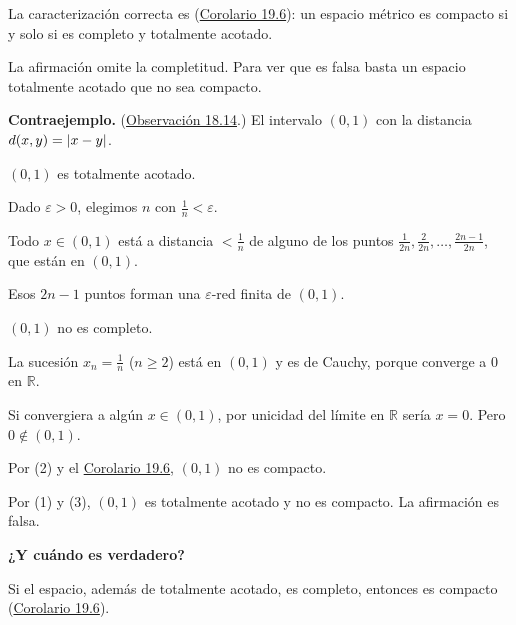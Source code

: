 \documentclass[11pt,a4paper]{article}
\newcommand{\R}{\mathbb{R}}\newcommand{\N}{\mathbb{N}}\newcommand{\Q}{\mathbb{Q}}
\providecommand{\lt}{<}\providecommand{\gt}{>}
\newcommand{\bloque}[1]{\par\smallskip\noindent\textbf{\color{acento}#1}\par}
\begin{document}
\begin{pasos}
\item[] La caracterización correcta es (\href{https://decostruttivismo.github.io/MAT2514-repaso/pdf/MAT2514_apuntes_completos.pdf\#nameddest=teorema.19.6}{Corolario 19.6}): un espacio métrico es compacto si y solo si es completo y totalmente acotado.
\item[] La afirmación omite la completitud. Para ver que es falsa basta un espacio totalmente acotado que no sea compacto.
\item[] \textbf{Contraejemplo.} (\href{https://decostruttivismo.github.io/MAT2514-repaso/pdf/MAT2514_apuntes_completos.pdf\#nameddest=teorema.18.14}{Observación 18.14}.) El intervalo $(0,1)$ con la distancia $d(x,y)=\lvert x-y\rvert$.
\item[(1)] $(0,1)$ es totalmente acotado.
\begin{subpasos}
\item Dado $\varepsilon\gt 0$, elegimos $n$ con $\frac1n\lt \varepsilon$.
\item Todo $x\in(0,1)$ está a distancia $\lt \frac1n$ de alguno de los puntos $\frac1{2n},\frac2{2n},\dots,\frac{2n-1}{2n}$, que están en $(0,1)$.
\item Esos $2n-1$ puntos forman una $\varepsilon$-red finita de $(0,1)$.
\end{subpasos}
\item[(2)] $(0,1)$ no es completo.
\begin{subpasos}
\item La sucesión $x_n=\frac1n$ ($n\ge2$) está en $(0,1)$ y es de Cauchy, porque converge a $0$ en $\R$.
\item Si convergiera a algún $x\in(0,1)$, por unicidad del límite en $\R$ sería $x=0$. Pero $0\notin(0,1)$.
\end{subpasos}
\item[(3)] Por (2) y el \href{https://decostruttivismo.github.io/MAT2514-repaso/pdf/MAT2514_apuntes_completos.pdf\#nameddest=teorema.19.6}{Corolario 19.6}, $(0,1)$ no es compacto.
\item[] Por (1) y (3), $(0,1)$ es totalmente acotado y no es compacto. La afirmación es falsa.
\end{pasos}
\bloque{¿Y cuándo es verdadero?}
\begin{pasos}
\item[] Si el espacio, además de totalmente acotado, es completo, entonces es compacto (\href{https://decostruttivismo.github.io/MAT2514-repaso/pdf/MAT2514_apuntes_completos.pdf\#nameddest=teorema.19.6}{Corolario 19.6}).
\end{pasos}
\end{document}
